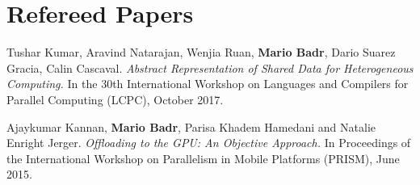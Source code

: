 \section{\sc Refereed Papers}

\onerow
{
  Tushar Kumar, Aravind Natarajan, Wenjia Ruan, \textbf{Mario Badr}, Dario Suarez Gracia, Calin Cascaval.
  \textit{Abstract Representation of Shared Data for Heterogeneous Computing.}
  In the 30th International Workshop on Languages and Compilers for Parallel Computing (LCPC), October 2017.
}

\onerow
{
  Ajaykumar Kannan, \textbf{Mario Badr}, Parisa Khadem Hamedani and Natalie Enright Jerger.
  \textit{Offloading to the GPU: An Objective Approach.}
  In Proceedings of the International Workshop on Parallelism in Mobile Platforms (PRISM), June 2015.
}
